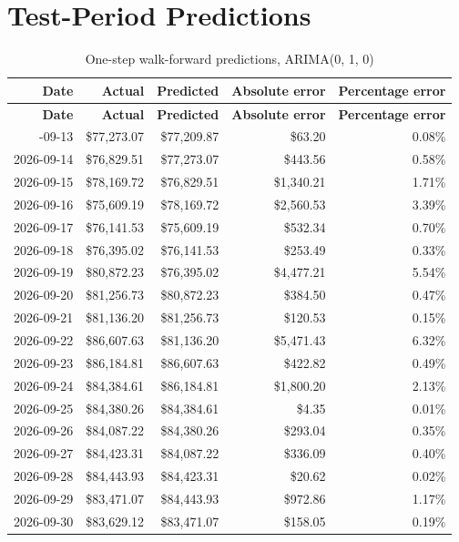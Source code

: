 \documentclass[11pt,a4paper]{article}
\begin{document}
\clearpage
\appendix
\section{Test-Period Predictions}

{\small
\begin{longtable}{rrrrr}
\caption{One-step walk-forward predictions, ARIMA(0, 1, 0)}\\
\toprule
\textbf{Date} & \textbf{Actual} & \textbf{Predicted} & \textbf{Absolute error} & \textbf{Percentage error} \\
\midrule
\endfirsthead
\toprule
\textbf{Date} & \textbf{Actual} & \textbf{Predicted} & \textbf{Absolute error} & \textbf{Percentage error} \\
\midrule
\endhead
\bottomrule
\endfoot
2026-09-13 & \$77,273.07 & \$77,209.87 & \$63.20 & 0.08\% \\
2026-09-14 & \$76,829.51 & \$77,273.07 & \$443.56 & 0.58\% \\
2026-09-15 & \$78,169.72 & \$76,829.51 & \$1,340.21 & 1.71\% \\
2026-09-16 & \$75,609.19 & \$78,169.72 & \$2,560.53 & 3.39\% \\
2026-09-17 & \$76,141.53 & \$75,609.19 & \$532.34 & 0.70\% \\
2026-09-18 & \$76,395.02 & \$76,141.53 & \$253.49 & 0.33\% \\
2026-09-19 & \$80,872.23 & \$76,395.02 & \$4,477.21 & 5.54\% \\
2026-09-20 & \$81,256.73 & \$80,872.23 & \$384.50 & 0.47\% \\
2026-09-21 & \$81,136.20 & \$81,256.73 & \$120.53 & 0.15\% \\
2026-09-22 & \$86,607.63 & \$81,136.20 & \$5,471.43 & 6.32\% \\
2026-09-23 & \$86,184.81 & \$86,607.63 & \$422.82 & 0.49\% \\
2026-09-24 & \$84,384.61 & \$86,184.81 & \$1,800.20 & 2.13\% \\
2026-09-25 & \$84,380.26 & \$84,384.61 & \$4.35 & 0.01\% \\
2026-09-26 & \$84,087.22 & \$84,380.26 & \$293.04 & 0.35\% \\
2026-09-27 & \$84,423.31 & \$84,087.22 & \$336.09 & 0.40\% \\
2026-09-28 & \$84,443.93 & \$84,423.31 & \$20.62 & 0.02\% \\
2026-09-29 & \$83,471.07 & \$84,443.93 & \$972.86 & 1.17\% \\
2026-09-30 & \$83,629.12 & \$83,471.07 & \$158.05 & 0.19\% \\

\end{longtable}}
\end{document}
